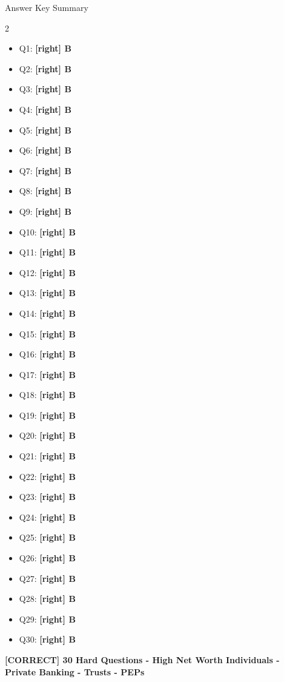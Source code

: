 \documentclass[11pt,a4paper]{beamer}
\newcommand{\greennote}[1]{\textcolor{green!50!black}{\textbf{[CORRECT] #1}}}
\newcommand{\correct}[1]{\textcolor{green!50!black}{\textbf{[right] #1}}}
\begin{document}
	
	\begin{frame}{Answer Key Summary}
		\begin{multicols}{2}
			\tiny
			\begin{itemize}
				\item Q1: \correct{B}
				\item Q2: \correct{B}
				\item Q3: \correct{B}
				\item Q4: \correct{B}
				\item Q5: \correct{B}
				\item Q6: \correct{B}
				\item Q7: \correct{B}
				\item Q8: \correct{B}
				\item Q9: \correct{B}
				\item Q10: \correct{B}
				\item Q11: \correct{B}
				\item Q12: \correct{B}
				\item Q13: \correct{B}
				\item Q14: \correct{B}
				\item Q15: \correct{B}
				\item Q16: \correct{B}
				\item Q17: \correct{B}
				\item Q18: \correct{B}
				\item Q19: \correct{B}
				\item Q20: \correct{B}
				\item Q21: \correct{B}
				\item Q22: \correct{B}
				\item Q23: \correct{B}
				\item Q24: \correct{B}
				\item Q25: \correct{B}
				\item Q26: \correct{B}
				\item Q27: \correct{B}
				\item Q28: \correct{B}
				\item Q29: \correct{B}
				\item Q30: \correct{B}
			\end{itemize}
		\end{multicols}
		\vspace{0.05cm}
		\centering
		\greennote{30 Hard Questions - High Net Worth Individuals - Private Banking - Trusts - PEPs}
	\end{frame}
	
\end{document}
